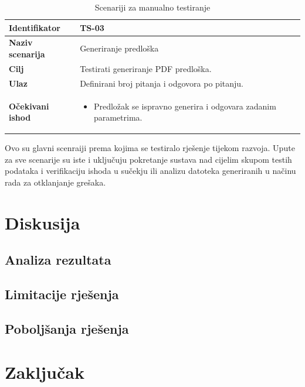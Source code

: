 \documentclass{foi}
\begin{document}
\begin{table}[H]
\begin{tabular}{|l|p{11cm}|}
\textbf{Identifikator} & TS-03 \\ \hline
\textbf{Naziv scenarija} & Generiranje predloška \\ \hline
\textbf{Cilj} & Testirati generiranje PDF predloška. \\ \hline
\textbf{Ulaz} & Definirani broj pitanja i odgovora po pitanju. \\ \hline
\textbf{Očekivani ishod} & 
\begin{itemize}
    \item Predložak se ispravno generira i odgovara zadanim parametrima.
\end{itemize} \\ \hline
\end{tabular}
\caption{Scenariji za manualno testiranje}
\end{table}

Ovo su glavni scenraiji prema kojima se testiralo rješenje tijekom razvoja. Upute za sve scenarije su iste i uključuju pokretanje sustava nad cijelim skupom testih podataka i verifikaciju ishoda u sučekju ili analizu datoteka generiranih u načinu rada za otklanjanje grešaka. 

\chapter{Diskusija}
\section{Analiza rezultata}
\section{Limitacije rješenja}
\section{Poboljšanja rješenja}

\chapter{Zaključak}

\printbibliography[title=Popis literature]

\listoffigures
{}
 
\listoftables
{}

\appendix
\renewcommand{\thechapter}{\arabic{chapter}}
\end{document}
